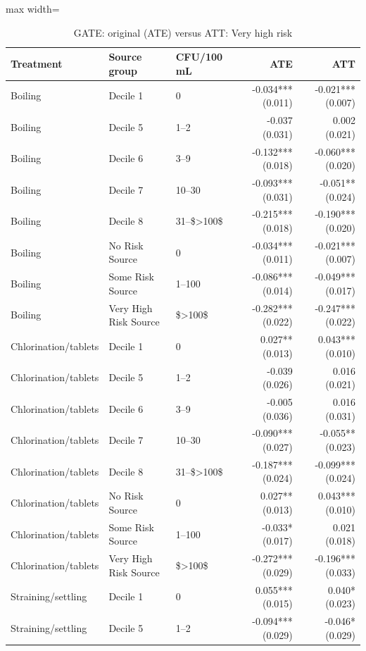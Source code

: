 \begin{table}[htbp]
\centering\scriptsize
\caption{GATE: original (ATE) versus ATT: Very high risk}
\label{tab:table-ate-att-heterogeneity-gates-VeryHighRiskHome}
\begin{adjustbox}{max width=\linewidth}
\begin{tabular}{lllrr}
\toprule
Treatment & Source group & CFU/100 mL & ATE & ATT \\
\midrule
Boiling & Decile 1 & 0 & -0.034*** (0.011) & -0.021*** (0.007) \\
Boiling & Decile 5 & 1--2 & -0.037 (0.031) & 0.002 (0.021) \\
Boiling & Decile 6 & 3--9 & -0.132*** (0.018) & -0.060*** (0.020) \\
Boiling & Decile 7 & 10--30 & -0.093*** (0.031) & -0.051** (0.024) \\
Boiling & Decile 8 & 31--\$\textgreater{}100\$ & -0.215*** (0.018) & -0.190*** (0.020) \\
Boiling & No Risk Source & 0 & -0.034*** (0.011) & -0.021*** (0.007) \\
Boiling & Some Risk Source & 1--100 & -0.086*** (0.014) & -0.049*** (0.017) \\
Boiling & Very High Risk Source & \$\textgreater{}100\$ & -0.282*** (0.022) & -0.247*** (0.022) \\
Chlorination/tablets & Decile 1 & 0 & 0.027** (0.013) & 0.043*** (0.010) \\
Chlorination/tablets & Decile 5 & 1--2 & -0.039 (0.026) & 0.016 (0.021) \\
Chlorination/tablets & Decile 6 & 3--9 & -0.005 (0.036) & 0.016 (0.031) \\
Chlorination/tablets & Decile 7 & 10--30 & -0.090*** (0.027) & -0.055** (0.023) \\
Chlorination/tablets & Decile 8 & 31--\$\textgreater{}100\$ & -0.187*** (0.024) & -0.099*** (0.024) \\
Chlorination/tablets & No Risk Source & 0 & 0.027** (0.013) & 0.043*** (0.010) \\
Chlorination/tablets & Some Risk Source & 1--100 & -0.033* (0.017) & 0.021 (0.018) \\
Chlorination/tablets & Very High Risk Source & \$\textgreater{}100\$ & -0.272*** (0.029) & -0.196*** (0.033) \\
Straining/settling & Decile 1 & 0 & 0.055*** (0.015) & 0.040* (0.023) \\
Straining/settling & Decile 5 & 1--2 & -0.094*** (0.029) & -0.046* (0.029) \\

\end{tabular}
\end{adjustbox}
\end{table}
